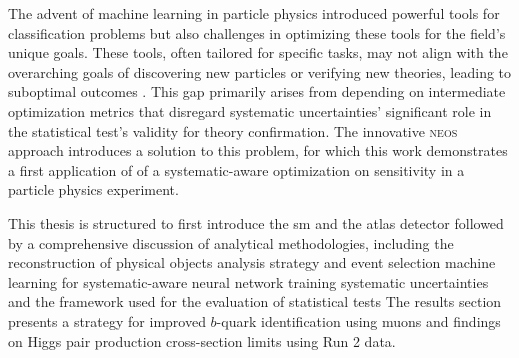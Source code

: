 The advent of machine learning in particle physics introduced powerful tools for classification problems but also challenges in optimizing these tools for the field's unique goals. These tools, often tailored for specific tasks, may not align with the overarching goals of discovering new particles or verifying new theories, leading to suboptimal outcomes \citep{guest2018deep}.
This gap primarily arises from depending on intermediate optimization metrics that disregard systematic uncertainties' significant role in the statistical test's validity for theory confirmation. The innovative \textsc{neos} approach \citep{Simpson_2023} introduces a solution to this problem, for which this work demonstrates a first application of of a systematic-aware optimization on sensitivity in a particle physics experiment.


This thesis is structured to first introduce the \ac{sm} and the \ac{atlas} detector followed by a comprehensive discussion of analytical methodologies, including the reconstruction of physical objects analysis strategy and event selection machine learning for systematic-aware neural network training systematic uncertainties and the framework used for the evaluation of statistical tests The results section presents a strategy for improved $b$-quark identification using muons and findings on Higgs pair production cross-section limits using Run 2 data.













